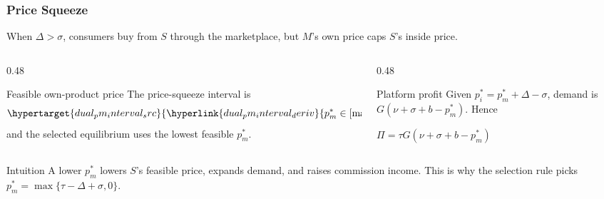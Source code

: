 \begin{frame}
  \frametitle{Price Squeeze}
  \footnotesize
  When $\Delta>\sigma$, consumers buy from $S$ through the marketplace, but
  $M$'s own price caps $S$'s inside price.

  \begin{columns}[T,onlytextwidth]
    \begin{column}{0.48\textwidth}
      \begin{block}{Feasible own-product price}
        The price-squeeze interval is
        \[
          \hypertarget{dual_pm_interval_src}{%
            \hyperlink{dual_pm_interval_deriv}{%
              p_m^*\in
              \left[
                \max\{\tau-\Delta+\sigma,0\},
                \tau+\min\{\sigma,0\}
              \right]}}
        \]
        and the selected equilibrium uses the lowest feasible $p_m^*$.
      \end{block}
    \end{column}

    \begin{column}{0.48\textwidth}
      \begin{block}{Platform profit}
        Given $p_i^*=p_m^*+\Delta-\sigma$, demand is
        $G(\nu+\sigma+b-p_m^*)$. Hence
        \begin{center}
          \hypertarget{dual_profit_src}{%
            \hyperlink{dual_profit_deriv}{%
              $\displaystyle \Pi=\tau G(\nu+\sigma+b-p_m^*)$}}
        \end{center}
      \end{block}
    \end{column}
  \end{columns}

  \begin{alertblock}{Intuition}
    A lower $p_m^*$ lowers $S$'s feasible price, expands demand, and raises
    commission income. This is why the selection rule picks
    $p_m^*=\max\{\tau-\Delta+\sigma,0\}$.
  \end{alertblock}
\end{frame}

